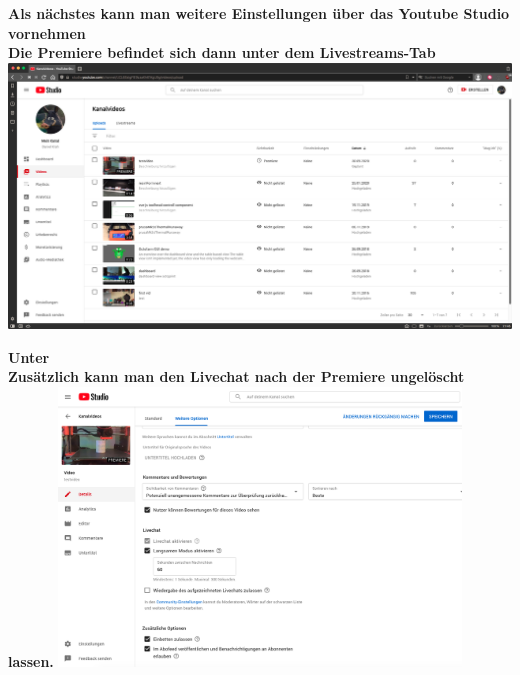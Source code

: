 \newpage
{}
\begin{center}
  \textbf{Als nächstes kann man weitere Einstellungen über das Youtube Studio vornehmen} \\
  \textbf{Die Premiere befindet sich dann unter dem Livestreams-Tab} \\
  {\vspace{0.3cm}}
  \includegraphics[width=\textwidth]{./pictures/premiere7.png}
\end{center}

\begin{center}
  \textbf{Unter } \\
  \textbf{Zusätzlich kann man den Livechat nach der Premiere ungelöscht lassen.}
  \includegraphics[width=0.8\textwidth]{./pictures/premiere8.png}
\end{center}

